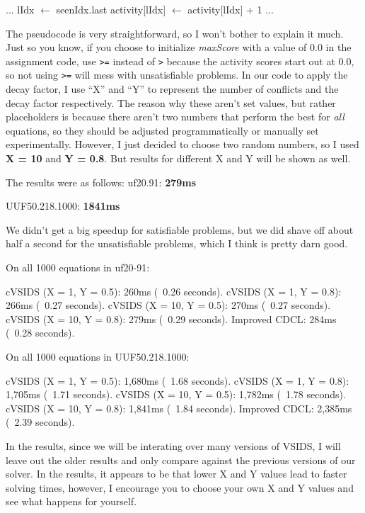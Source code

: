 \begin{algorithm}[H]
\caption{cVSIDS First UIP resolution}\label{alg:37}
\begin{algorithmic}[1]

\State ...
    \State lIdx $\gets$ seenIdx.last 
    \State activity[lIdx] $\gets$ activity[lIdx] + 1
    \State ...
\EndWhile

\EndProcedure
\end{algorithmic}
\end{algorithm}

The pseudocode is very straightforward, so I won't bother to explain it much. Just 
so you know, if you choose to initialize \textit{maxScore} with a value of 0.0 in the 
assignment code, use \verb|>=| instead of \verb|>| because the activity scores start 
out at 0.0, so not using \verb|>=| will mess with unsatisfiable problems. In our 
code to apply the decay factor, I use ``X'' and ``Y'' to represent the number of 
conflicts and the decay factor respectively. The reason why these aren't set values,
but rather placeholders is because there aren't two numbers that perform the best for
\textit{all} equations, so they should be adjusted programmatically or manually set 
experimentally. However, I just decided to choose two random numbers, so I used 
\textbf{X = 10} and \textbf{Y = 0.8}. But results for different X and Y will be 
shown as well.

The results were as follows:
\noindent
uf20.91: \textbf{279ms}

\noindent
UUF50.218.1000: \textbf{1841ms}

We didn't get a big speedup for satisfiable problems, but we 
did shave off about half a second for the unsatisfiable problems, 
which I think is pretty darn good.

\begin{FVerbatim}
On all 1000 equations in uf20-91:

cVSIDS (X = 1, Y = 0.5):    260ms (~0.26 seconds).
cVSIDS (X = 1, Y = 0.8):    266ms (~0.27 seconds).
cVSIDS (X = 10, Y = 0.5):   270ms (~0.27 seconds).
cVSIDS (X = 10, Y = 0.8):   279ms (~0.29 seconds).
Improved CDCL:              284ms (~0.28 seconds).

On all 1000 equations in UUF50.218.1000:

cVSIDS (X = 1, Y = 0.5):    1,680ms (~1.68 seconds).
cVSIDS (X = 1, Y = 0.8):    1,705ms (~1.71 seconds).
cVSIDS (X = 10, Y = 0.5):   1,782ms (~1.78 seconds).
cVSIDS (X = 10, Y = 0.8):   1,841ms (~1.84 seconds).
Improved CDCL:              2,385ms (~2.39 seconds).
\end{FVerbatim}
\noindent
In the results, since we will be interating over many versions of VSIDS, 
I will leave out the older results and only compare against the previous 
versions of our solver. In the results, it appears to be that lower 
X and Y values lead to faster solving times, however, I encourage you to 
choose your own X and Y values and see what happens for yourself.

